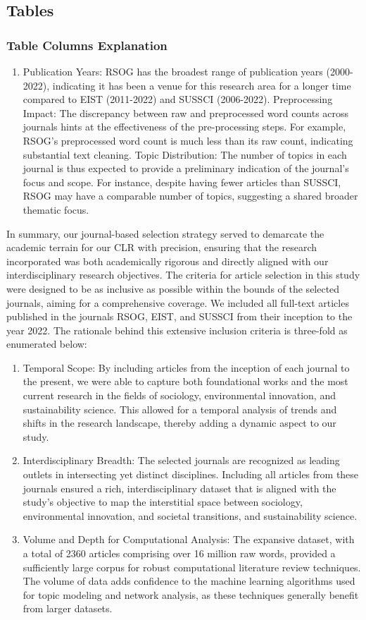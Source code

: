 \documentclass[12pt]{article}
\begin{document}
\subsection{Tables}
\subsubsection{Table Columns Explanation} 
\begin{enumerate}
    \item Publication Years: RSOG has the broadest range of publication years (2000-2022), indicating it has been a venue for this research area for a longer time compared to EIST (2011-2022) and SUSSCI (2006-2022).
    Preprocessing Impact: The discrepancy between raw and preprocessed word counts across journals hints at the effectiveness of the pre-processing steps. For example, RSOG's preprocessed word count is much less than its raw count, indicating substantial text cleaning.
    Topic Distribution: The number of topics in each journal is thus expected to provide a preliminary indication of the journal's focus and scope. For instance, despite having fewer articles than SUSSCI, RSOG may have a comparable number of topics, suggesting a shared broader thematic focus.
\end{enumerate}
In summary, our journal-based selection strategy served to demarcate the academic terrain for our CLR with precision, ensuring that the research incorporated was both academically rigorous and directly aligned with our interdisciplinary research objectives. The criteria for article selection in this study were designed to be as inclusive as possible within the bounds of the selected journals, aiming for a comprehensive coverage. We included all full-text articles published in the journals RSOG, EIST, and SUSSCI from their inception to the year 2022. The rationale behind this extensive inclusion criteria is three-fold as enumerated below:
\begin{enumerate}
    \item Temporal Scope: By including articles from the inception of each journal to the present, we were able to capture both foundational works and the most current research in the fields of sociology, environmental innovation, and sustainability science. This allowed for a temporal analysis of trends and shifts in the research landscape, thereby adding a dynamic aspect to our study.
    \item Interdisciplinary Breadth: The selected journals are recognized as leading outlets in intersecting yet distinct disciplines. Including all articles from these journals ensured a rich, interdisciplinary dataset that is aligned with the study's objective to map the interstitial space between sociology, environmental innovation, and societal transitions, and sustainability science.
    \item Volume and Depth for Computational Analysis: The expansive dataset, with a total of 2360 articles comprising over 16 million raw words, provided a sufficiently large corpus for robust computational literature review techniques. The volume of data adds confidence to the machine learning algorithms used for topic modeling and network analysis, as these techniques generally benefit from larger datasets.
\end{enumerate}
\end{document}
